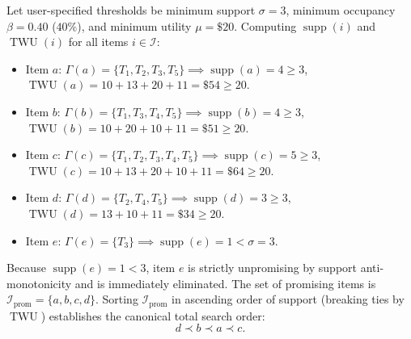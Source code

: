 \documentclass[runningheads]{llncs}
\newcommand{\supp}{\operatorname{supp}}
\newcommand{\twu}{\operatorname{TWU}}
\begin{document}
\begin{example}
Let user-specified thresholds be minimum support $\sigma = 3$, minimum occupancy $\beta = 0.40$ ($40\%$), and minimum utility $\mu = \$20$.
Computing $\supp(i)$ and $\twu(i)$ for all items $i \in \mathcal{I}$:
\begin{itemize}
    \item Item $a$: $\Gamma(a) = \{T_1, T_2, T_3, T_5\} \implies \supp(a) = 4 \ge 3$, $\twu(a) = 10 + 13 + 20 + 11 = \$54 \ge 20$.
    \item Item $b$: $\Gamma(b) = \{T_1, T_3, T_4, T_5\} \implies \supp(b) = 4 \ge 3$, $\twu(b) = 10 + 20 + 10 + 11 = \$51 \ge 20$.
    \item Item $c$: $\Gamma(c) = \{T_1, T_2, T_3, T_4, T_5\} \implies \supp(c) = 5 \ge 3$, $\twu(c) = 10 + 13 + 20 + 10 + 11 = \$64 \ge 20$.
    \item Item $d$: $\Gamma(d) = \{T_2, T_4, T_5\} \implies \supp(d) = 3 \ge 3$, $\twu(d) = 13 + 10 + 11 = \$34 \ge 20$.
    \item Item $e$: $\Gamma(e) = \{T_3\} \implies \supp(e) = 1 < \sigma = 3$.
\end{itemize}
Because $\supp(e) = 1 < 3$, item $e$ is strictly unpromising by support anti-monotonicity and is immediately eliminated. The set of promising items is $\mathcal{I}_{\text{prom}} = \{a, b, c, d\}$.
Sorting $\mathcal{I}_{\text{prom}}$ in ascending order of support (breaking ties by $\twu$) establishes the canonical total search order:
\begin{equation*}
d \prec b \prec a \prec c.
\end{equation*}
\end{example}
\end{document}

